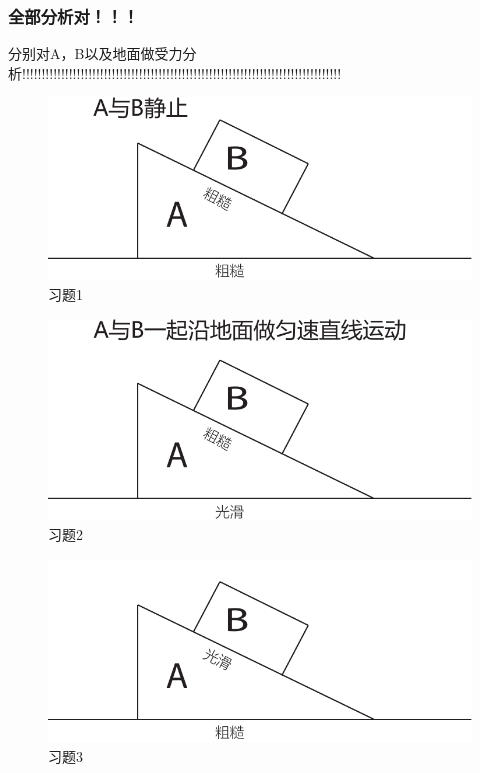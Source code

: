 \documentclass[a4paper, 11pt, oneside]{article}
\begin{document}
\subsubsection{全部分析对！！！}
分别对A，B以及地面做受力分析\;!!!!!!!!!!!!!!!!!!!!!!!!!!!!!!!!!!!!!!!!!!!!!!!!!!!!!!!!!!!!!!!!!!!!!!!!!!!!!!!!!! \\
\begin{figure}[!h]
\center
\includegraphics[scale=0.8]{./asset/force_analysis_1.pdf}
\caption{习题1}
\end{figure}
\begin{figure}[!h]
\center
\includegraphics[scale=0.8]{./asset/force_analysis_2.pdf}
\caption{习题2}
\end{figure}
\begin{figure}[!h]
\center
\includegraphics[scale=0.8]{./asset/force_analysis_3.pdf}
\caption{习题3}
\end{figure}
\end{document}
